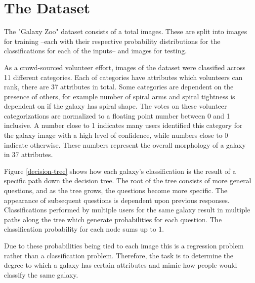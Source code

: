 \section{The Dataset}

The "Galaxy Zoo" dataset consists of a total  images. These are split into  images for training --each with their respective probability distributions for the classifications for each of the inputs-- and  images for testing.

As a crowd-sourced volunteer effort, images of the dataset were classified across 11 different categories. Each of categories have attributes which volunteers can rank, there are 37 attributes in total. Some categories are dependent on the presence of others, for example number of spiral arms and spiral tightness is dependent on if the galaxy has spiral shape. The votes on these volunteer categorizations are normalized to a floating point number between 0 and 1 inclusive. A number close to 1 indicates many users identified this category for the galaxy image with a high level of confidence, while numbers close to 0 indicate otherwise. These numbers represent the overall morphology of a galaxy in 37 attributes.

Figure \ref{decision-tree} shows how each galaxy's classification is the result of a specific path down the decision tree. The root of the tree consists of more general questions, and as the tree grows, the questions become more specific. The appearance of subsequent questions is dependent upon previous responses. Classifications performed by multiple users for the same galaxy result in multiple paths along the tree which generate probabilities for each question. The classification probability for each node sums up to 1.

Due to these probabilities being tied to each image this is a regression problem rather than a classification problem. Therefore, the task is to determine the degree to which a galaxy has certain attributes and mimic how people would classify the same galaxy.


